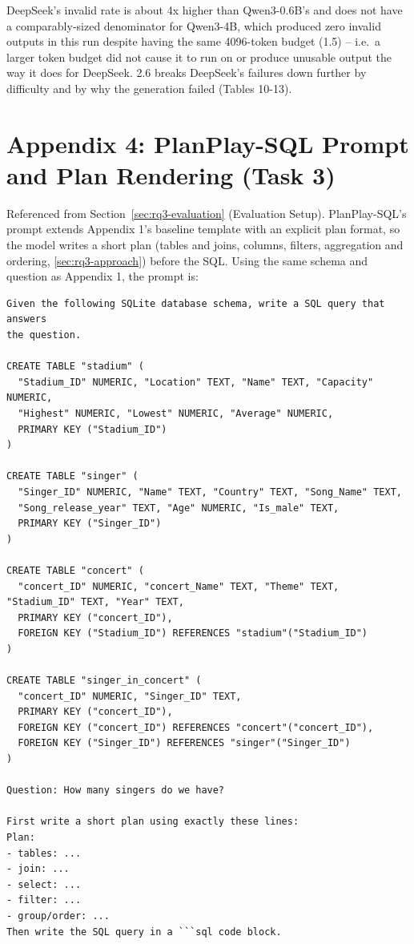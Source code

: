 \documentclass[11pt]{article}
\begin{document}
DeepSeek's invalid rate is about 4x higher than Qwen3-0.6B's and does not have a comparably-sized denominator for Qwen3-4B, which produced zero invalid outputs in this run despite having the same 4096-token budget (1.5) -- i.e.\ a larger token budget did not cause it to run on or produce unusable output the way it does for DeepSeek. 2.6 breaks DeepSeek's failures down further by difficulty and by why the generation failed (Tables 10-13).

\section*{Appendix 4: PlanPlay-SQL Prompt and Plan Rendering (Task 3)}
\label{sec:appendix4}

Referenced from Section~\ref{sec:rq3-evaluation} (Evaluation Setup). PlanPlay-SQL's prompt extends Appendix 1's baseline template with an explicit plan format, so the model writes a short plan (tables and joins, columns, filters, aggregation and ordering, \ref{sec:rq3-approach}) before the SQL. Using the same schema and question as Appendix 1, the prompt is:

\begin{verbatim}
Given the following SQLite database schema, write a SQL query that answers
the question.

CREATE TABLE "stadium" (
  "Stadium_ID" NUMERIC, "Location" TEXT, "Name" TEXT, "Capacity" NUMERIC,
  "Highest" NUMERIC, "Lowest" NUMERIC, "Average" NUMERIC,
  PRIMARY KEY ("Stadium_ID")
)

CREATE TABLE "singer" (
  "Singer_ID" NUMERIC, "Name" TEXT, "Country" TEXT, "Song_Name" TEXT,
  "Song_release_year" TEXT, "Age" NUMERIC, "Is_male" TEXT,
  PRIMARY KEY ("Singer_ID")
)

CREATE TABLE "concert" (
  "concert_ID" NUMERIC, "concert_Name" TEXT, "Theme" TEXT, "Stadium_ID" TEXT, "Year" TEXT,
  PRIMARY KEY ("concert_ID"),
  FOREIGN KEY ("Stadium_ID") REFERENCES "stadium"("Stadium_ID")
)

CREATE TABLE "singer_in_concert" (
  "concert_ID" NUMERIC, "Singer_ID" TEXT,
  PRIMARY KEY ("concert_ID"),
  FOREIGN KEY ("concert_ID") REFERENCES "concert"("concert_ID"),
  FOREIGN KEY ("Singer_ID") REFERENCES "singer"("Singer_ID")
)

Question: How many singers do we have?

First write a short plan using exactly these lines:
Plan:
- tables: ...
- join: ...
- select: ...
- filter: ...
- group/order: ...
Then write the SQL query in a ```sql code block.
\end{verbatim}
\end{document}
